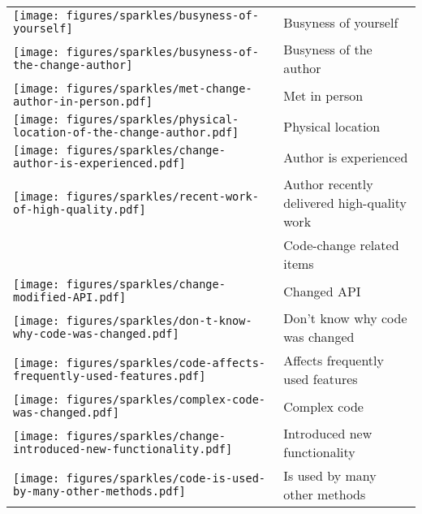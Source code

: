 \begin{table}[t!]
\begin{tabular}{ll}
\vspace{-2pt}\texttt{[image: figures/sparkles/busyness-of-yourself]} & Busyness of yourself\\
\vspace{-2pt}\texttt{[image: figures/sparkles/busyness-of-the-change-author]} & Busyness of the author\\
\vspace{-2pt}\texttt{[image: figures/sparkles/met-change-author-in-person.pdf]} & Met in person\\
\vspace{-2pt}\texttt{[image: figures/sparkles/physical-location-of-the-change-author.pdf]} & Physical location\\
\vspace{-2pt}\texttt{[image: figures/sparkles/change-author-is-experienced.pdf]} & Author is experienced\\
\vspace{-2pt}\texttt{[image: figures/sparkles/recent-work-of-high-quality.pdf]} & Author recently delivered high-quality work\\
\midrule
\vspace{-2pt}& Code-change related items \\
\midrule
\vspace{-2pt}\texttt{[image: figures/sparkles/change-modified-API.pdf]} & Changed API\\
\vspace{-2pt}\texttt{[image: figures/sparkles/don-t-know-why-code-was-changed.pdf]} & Don't know why code was changed\\
\vspace{-2pt}\texttt{[image: figures/sparkles/code-affects-frequently-used-features.pdf]} & Affects frequently used features\\
\vspace{-2pt}\texttt{[image: figures/sparkles/complex-code-was-changed.pdf]} & Complex code\\
\vspace{-2pt}\texttt{[image: figures/sparkles/change-introduced-new-functionality.pdf]} & Introduced new functionality\\
\vspace{-2pt}\texttt{[image: figures/sparkles/code-is-used-by-many-other-methods.pdf]} & Is used by many other methods\\

\end{tabular}
\end{table}

